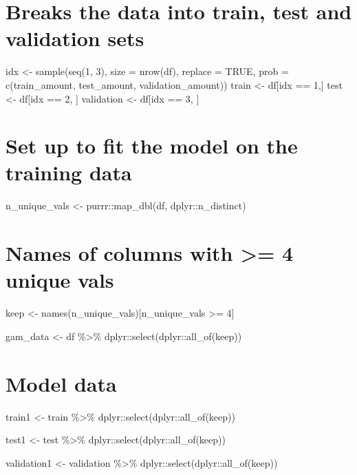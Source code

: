 \documentclass[
]{book}
\begin{document}
\chapter{Breaks the data into train, test and validation sets}\label{breaks-the-data-into-train-test-and-validation-sets-4}

idx \textless- sample(seq(1, 3), size = nrow(df), replace = TRUE, prob =
c(train\_amount, test\_amount, validation\_amount)) train \textless- df{[}idx == 1,{]} test \textless- df{[}idx == 2, {]} validation \textless- df{[}idx == 3, {]}

\chapter{Set up to fit the model on the training data}\label{set-up-to-fit-the-model-on-the-training-data}

n\_unique\_vals \textless- purrr::map\_dbl(df, dplyr::n\_distinct)

\chapter{Names of columns with \textgreater= 4 unique vals}\label{names-of-columns-with-4-unique-vals}

keep \textless- names(n\_unique\_vals){[}n\_unique\_vals \textgreater= 4{]}

gam\_data \textless- df \%\textgreater\% dplyr::select(dplyr::all\_of(keep))

\chapter{Model data}\label{model-data}

train1 \textless- train \%\textgreater\% dplyr::select(dplyr::all\_of(keep))

test1 \textless- test \%\textgreater\% dplyr::select(dplyr::all\_of(keep))

validation1 \textless- validation \%\textgreater\% dplyr::select(dplyr::all\_of(keep))
\end{document}
